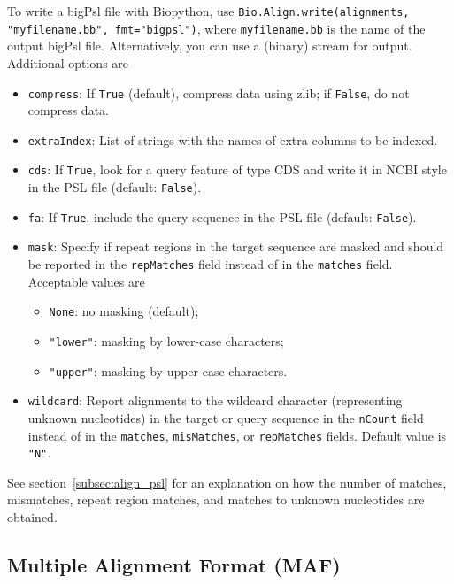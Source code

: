 To write a bigPsl file with Biopython, use \verb|Bio.Align.write(alignments, "myfilename.bb", fmt="bigpsl")|, where \verb|myfilename.bb| is the name of the output bigPsl file. Alternatively, you can use a (binary) stream for output. Additional options are
\begin{itemize}
\item \verb|compress|: If \verb|True| (default), compress data using zlib; if \verb|False|, do not compress data.
\item \verb|extraIndex|: List of strings with the names of extra columns to be indexed.
\item \verb|cds|: If \verb|True|, look for a query feature of type CDS and write it in NCBI style in the PSL file (default: \verb|False|).
\item \verb|fa|: If \verb|True|, include the query sequence in the PSL file (default: \verb|False|).
\item \verb|mask|: Specify if repeat regions in the target sequence are masked and should be reported in the \verb|repMatches| field instead of in the \verb|matches| field.  Acceptable values are
\begin{itemize}
\item \verb|None|: no masking (default);
\item \verb|"lower"|: masking by lower-case characters;
\item \verb|"upper"|: masking by upper-case characters.
\end{itemize}
\item \verb|wildcard|: Report alignments to the wildcard character (representing unknown nucleotides) in the target or query sequence in the \verb|nCount| field instead of in the \verb|matches|, \verb|misMatches|, or \verb|repMatches| fields.  Default value is \verb|"N"|.
\end{itemize}
See section~\ref{subsec:align_psl} for an explanation on how the number of matches, mismatches, repeat region matches, and matches to unknown nucleotides are obtained.


\subsection{Multiple Alignment Format (MAF)}
\label{subsec:align_maf}

